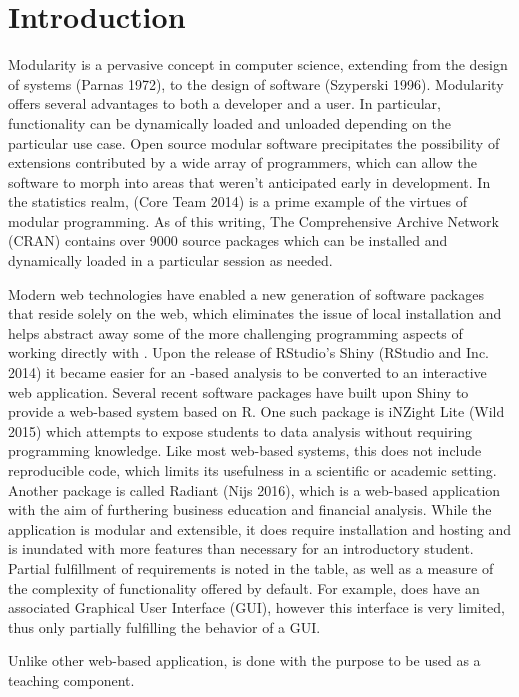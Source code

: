 \section*{Introduction}

Modularity is a pervasive concept in computer science, extending from the design of systems (Parnas 1972), to the design of software (Szyperski 1996). Modularity offers several advantages to both a developer and a user. In particular, functionality can be dynamically loaded and unloaded depending on the particular use case. Open source modular software precipitates the possibility of extensions contributed by a wide array of programmers, which can allow the software to morph into areas that weren’t anticipated early in development. In the statistics realm, \R (\R Core Team 2014) is a prime example of the virtues of modular programming. As of this writing, The Comprehensive \R Archive Network (CRAN) contains over 9000 source packages which can be installed and dynamically loaded in a particular
session as needed.

Modern web technologies have enabled a new generation of software packages that reside solely on the web, which eliminates the issue of local installation and helps abstract away some of the more challenging programming aspects of working directly with \R. Upon the release of RStudio’s Shiny (RStudio and Inc. 2014) it became easier for an \R-based analysis to be converted to an interactive web application. Several recent software packages have built upon Shiny to provide a web-based system based on R. One such package is iNZight Lite (Wild 2015) which attempts to expose students to data analysis without requiring programming knowledge. Like most web-based systems, this does not include reproducible \R code, which limits its usefulness in a scientific or academic setting. Another package is called Radiant (Nijs 2016), which is a web-based application with the aim of furthering business education and financial analysis. While the application is modular and extensible, it does require installation and hosting and is inundated with more features than necessary for an introductory student.  Partial fulfillment of requirements is noted in the table, as well as a measure of the complexity of functionality offered by default. For example, \R does have an associated Graphical User Interface (GUI), however this interface is very limited, thus only partially fulfilling the behavior of a GUI.

Unlike other web-based application, \FIRSTkit is done with the purpose to be used as a teaching component.

